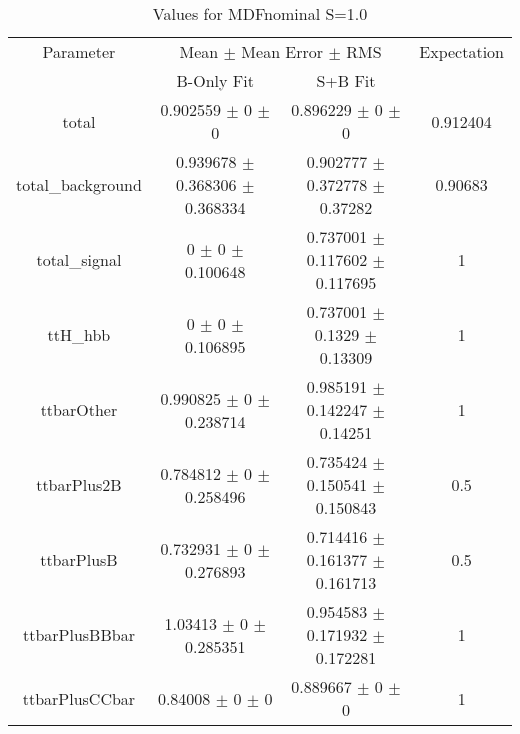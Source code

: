 \begin{table}
\centering
\caption{Values for MDFnominal S=1.0}
\begin{tabular}{cccc}
\toprule
Parameter & \multicolumn{2}{c}{Mean $\pm$ Mean Error $\pm$ RMS} & Expectation\\
 & B-Only Fit & S+B Fit & \\
\midrule
total & \num{0.902559} $\pm$ \num{0} $\pm$ \num{0} & \num{0.896229} $\pm$ \num{0} $\pm$ \num{0} & \num{0.912404}\\
total\_background & \num{0.939678} $\pm$ \num{0.368306} $\pm$ \num{0.368334} & \num{0.902777} $\pm$ \num{0.372778} $\pm$ \num{0.37282} & \num{0.90683}\\
total\_signal & \num{0} $\pm$ \num{0} $\pm$ \num{0.100648} & \num{0.737001} $\pm$ \num{0.117602} $\pm$ \num{0.117695} & \num{1}\\
ttH\_hbb & \num{0} $\pm$ \num{0} $\pm$ \num{0.106895} & \num{0.737001} $\pm$ \num{0.1329} $\pm$ \num{0.13309} & \num{1}\\
ttbarOther & \num{0.990825} $\pm$ \num{0} $\pm$ \num{0.238714} & \num{0.985191} $\pm$ \num{0.142247} $\pm$ \num{0.14251} & \num{1}\\
ttbarPlus2B & \num{0.784812} $\pm$ \num{0} $\pm$ \num{0.258496} & \num{0.735424} $\pm$ \num{0.150541} $\pm$ \num{0.150843} & \num{0.5}\\
ttbarPlusB & \num{0.732931} $\pm$ \num{0} $\pm$ \num{0.276893} & \num{0.714416} $\pm$ \num{0.161377} $\pm$ \num{0.161713} & \num{0.5}\\
ttbarPlusBBbar & \num{1.03413} $\pm$ \num{0} $\pm$ \num{0.285351} & \num{0.954583} $\pm$ \num{0.171932} $\pm$ \num{0.172281} & \num{1}\\
ttbarPlusCCbar & \num{0.84008} $\pm$ \num{0} $\pm$ \num{0} & \num{0.889667} $\pm$ \num{0} $\pm$ \num{0} & \num{1}\\
\bottomrule
\end{tabular}
\end{table}